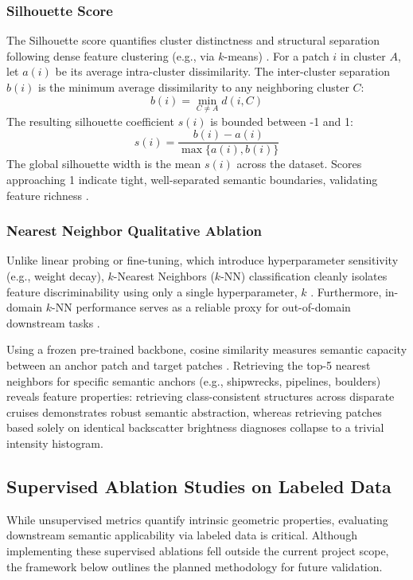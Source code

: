 \documentclass[12pt]{article}
\begin{document}
\subsubsection{Silhouette Score}
The Silhouette score quantifies cluster distinctness and structural separation following dense feature clustering (e.g., via $k$-means) \cite{silhoutte_ablation}. For a patch $i$ in cluster $A$, let $a(i)$ be its average intra-cluster dissimilarity. The inter-cluster separation $b(i)$ is the minimum average dissimilarity to any neighboring cluster $C$:
\begin{equation}
b(i) = \min_{C \neq A} d(i, C)
\end{equation}
The resulting silhouette coefficient $s(i)$ is bounded between -1 and 1:
\begin{equation}
s(i) = \frac{b(i) - a(i)}{\max\{a(i), b(i)\}}
\end{equation}
The global silhouette width is the mean $s(i)$ across the dataset. Scores approaching 1 indicate tight, well-separated semantic boundaries, validating feature richness \cite{silhoutte_ablation}.

\subsubsection{Nearest Neighbor Qualitative Ablation}
Unlike linear probing or fine-tuning, which introduce hyperparameter sensitivity (e.g., weight decay), $k$-Nearest Neighbors ($k$-NN) classification cleanly isolates feature discriminability using only a single hyperparameter, $k$ \cite{lee2023rethinking}. Furthermore, in-domain $k$-NN performance serves as a reliable proxy for out-of-domain downstream tasks \cite{marks2024closer}. 

Using a frozen pre-trained backbone, cosine similarity measures semantic capacity between an anchor patch and target patches \cite{lee2023rethinking, marks2024closer}. Retrieving the top-5 nearest neighbors for specific semantic anchors (e.g., shipwrecks, pipelines, boulders) reveals feature properties: retrieving class-consistent structures across disparate cruises demonstrates robust semantic abstraction, whereas retrieving patches based solely on identical backscatter brightness diagnoses collapse to a trivial intensity histogram.

\subsection{Supervised Ablation Studies on Labeled Data}
While unsupervised metrics quantify intrinsic geometric properties, evaluating downstream semantic applicability via labeled data is critical. Although implementing these supervised ablations fell outside the current project scope, the framework below outlines the planned methodology for future validation.
\end{document}
